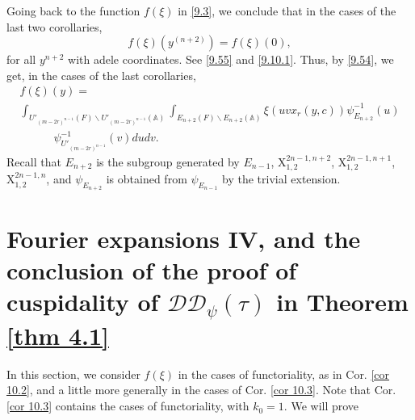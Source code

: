 \documentclass[12pts]{amsart}
\newcommand{\BA}{{\mathbb {A}}}
\begin{document}
Going back to the function $f(\xi)$ in \eqref{9.3}, we conclude that in the cases of the last two corollaries, 
\begin{equation}\label{10.32}
f(\xi)(y^{(n+2)})=f(\xi)(0),
\end{equation}
for all  $y^{n+2}$ with adele coordinates. See \eqref{9.55} and \eqref{9.10.1}. Thus, by \eqref{9.54}, we get, in the cases of the last corollaries,
\begin{multline}\label{10.33}
f(\xi)(y)=\\
\int_{U'_{{(m-2r)}^{n-1}}(F)\backslash
	U'_{{(m-2r)}^{n-1}}(\BA)}\int_{E_{n+2}(F)\backslash E_{n+2}(\BA)}\xi(uvx_r(y,c))\psi^{-1}_{E_{n+2}}(u)\\
\quad\quad\quad\psi^{-1}_{U'_{{(m-2r)}^{n-1}}}(v)dudv.
\end{multline}
Recall that $E_{n+2}$ is the subgroup generated by $E_{n-1}$, $\mathrm{X}_{1,2}^{2n-1,n+2}$, $\mathrm{X}_{1,2}^{2n-1,n+1}$, $\mathrm{X}_{1,2}^{2n-1,n}$, and $\psi_{E_{n+2}}$ is obtained from $\psi_{E_{n-1}}$ by the trivial extension.

\section{Fourier expansions IV, and the conclusion of the proof of cuspidality of $\mathcal{D}\mathcal{D}_\psi(\tau)$ in Theorem \ref{thm 4.1}}

In this section, we consider $f(\xi)$ in the cases of functoriality, as in Cor. \ref{cor 10.2}, and a little more generally in the cases of Cor. \ref{cor 10.3}. Note that Cor. \ref{cor 10.3} contains the cases of functoriality, with $k_0=1$. We will prove
\end{document}
